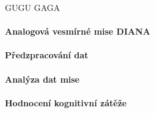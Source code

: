 GUGU GAGA

\paragraph{Analogová vesmírné mise DIANA}
\paragraph{Předzpracování dat}
\paragraph{Analýza dat mise}
\paragraph{Hodnocení kognitivní zátěže}
